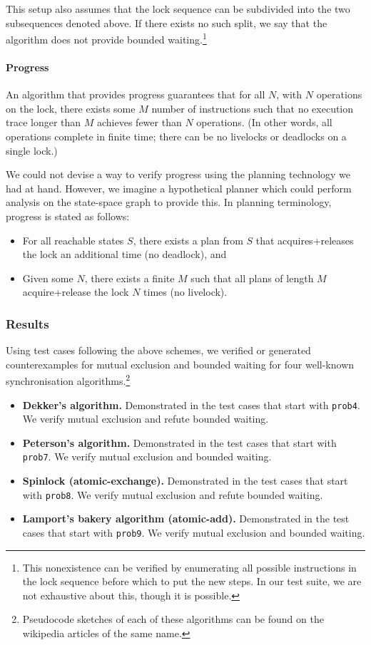 		This setup also assumes that the lock sequence can be subdivided into the two subsequences denoted above. If there exists no such split, we say that the algorithm does not provide bounded waiting.\footnote{
		This nonexistence can be verified by enumerating all possible instructions in the lock sequence before which to put the new steps. In our test suite, we are not exhaustive about this, though it is possible.}

\paragraph{Progress}
An algorithm that provides progress guarantees that for all $N$, with $N$ operations on the lock, there exists some $M$ number of instructions such that no execution trace longer than $M$ achieves fewer than $N$ operations. (In other words, all operations complete in finite time; there can be no livelocks or deadlocks on a single lock.)

		We could not devise a way to verify progress using the planning technology we had at hand. However, we imagine a hypothetical planner which could perform analysis on the state-space graph to provide this. In planning terminology, progress is stated as follows:
		\begin{itemize}
			\item For all reachable states $S$, there exists a plan from $S$ that acquires+releases the lock an additional time (no deadlock), and
			\item Given some $N$, there exists a finite $M$ such that all plans of length $M$ acquire+release the lock $N$ times (no livelock).
		\end{itemize}

\subsubsection{Results}

Using test cases following the above schemes, we verified or generated counterexamples for mutual exclusion and bounded waiting for four well-known synchronisation algorithms.\footnote{
Pseudocode sketches of each of these algorithms can be found on the wikipedia articles of the same name.}

\begin{itemize}
	\item {\bf Dekker's algorithm.} Demonstrated in the test cases that start with \texttt{prob4}. We verify mutual exclusion and refute bounded waiting.
	\item {\bf Peterson's algorithm.} Demonstrated in the test cases that start with \texttt{prob7}. We verify mutual exclusion and bounded waiting.
	\item {\bf Spinlock (atomic-exchange).} Demonstrated in the test cases that start with \texttt{prob8}. We verify mutual exclusion and refute bounded waiting.
	\item {\bf Lamport's bakery algorithm (atomic-add).} Demonstrated in the test cases that start with \texttt{prob9}. We verify mutual exclusion and bounded waiting.
\end{itemize}


